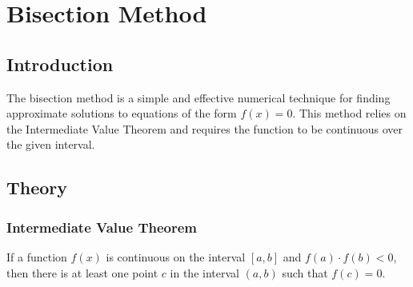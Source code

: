 \documentclass[12pt,a4paper]{article}
\begin{document}
\section{Bisection Method}	
	
\subsection{Introduction}

The bisection method is a simple and effective numerical technique for finding approximate solutions to equations of the form \( f(x) = 0 \). This method relies on the Intermediate Value Theorem and requires the function to be continuous over the given interval.


\subsection{Theory}

\subsubsection{Intermediate Value Theorem}

If a function \( f(x) \) is continuous on the interval \([a, b]\) and \( f(a) \cdot f(b) < 0 \), then there is at least one point \( c \) in the interval \((a, b)\) such that \( f(c) = 0 \).
\end{document}
